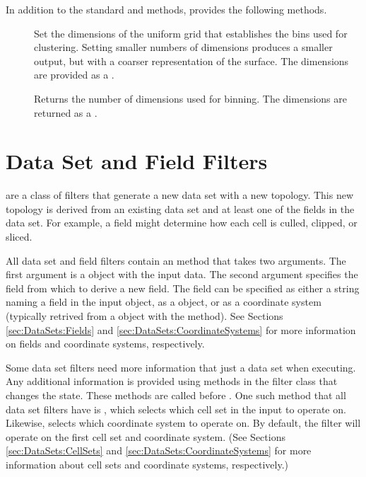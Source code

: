 In addition to the standard  and
 methods, 
provides the following methods.

\begin{description}
\item[] Set the dimensions of the uniform
  grid that establishes the bins used for clustering. Setting smaller
  numbers of dimensions produces a smaller output, but with a coarser
  representation of the surface. The dimensions are provided as a
  .
\item[] Returns the number of dimensions
  used for binning. The dimensions are returned as a .
\end{description}



\section{Data Set and Field Filters}


 are a class of filters that generate a
new data set with a new topology. This new topology is derived from an
existing data set and at least one of the fields in the data set. For
example, a field might determine how each cell is culled, clipped, or
sliced.

All data set and field filters contain an  method that
takes two arguments. The first argument is a  object with
the input data. The second argument specifies the field from which to
derive a new field. The field can be specified as either a string naming a
field in the input  object, as a 
object, or as a coordinate system (typically retrived from a
 object with the 
method). See Sections \ref{sec:DataSets:Fields} and
\ref{sec:DataSets:CoordinateSystems} for more information on fields and
coordinate systems, respectively.

Some data set filters need more information that just a data set when
executing. Any additional information is provided using methods in the
filter class that changes the state. These methods are called before
. One such method that all data set filters have is
, which selects which cell set in the input
 to operate on. Likewise,
 selects which coordinate system to
operate on. By default, the filter will operate on the first cell set and
coordinate system. (See Sections \ref{sec:DataSets:CellSets} and
\ref{sec:DataSets:CoordinateSystems} for more information about cell sets
and coordinate systems, respectively.)


